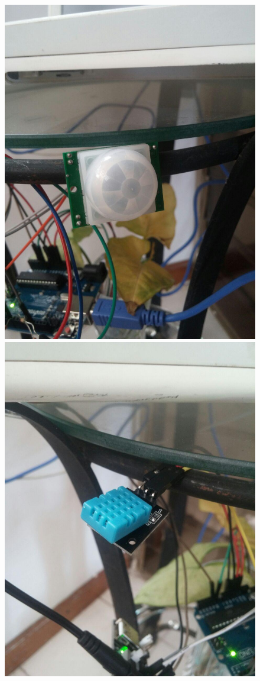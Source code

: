 \begin{itemize}
\begin{figure}[!htb]
\includegraphics[scale=0.11]{./Figuras/pir_ext.jpg}
\includegraphics[scale=0.11]{./Figuras/temp_ext.jpg}

\end{figure}
\end{itemize}
